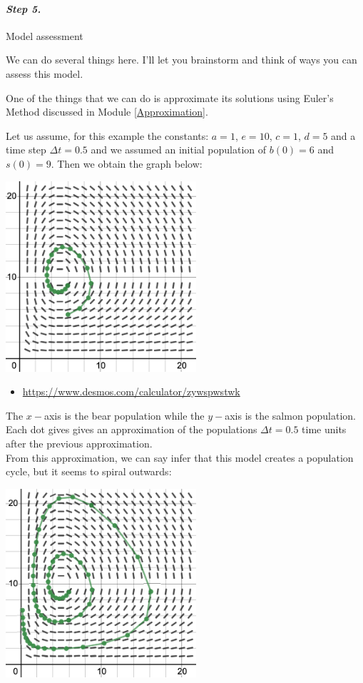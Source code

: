 \paragraph{\emph{Step 5.}} Model assessment

\begin{example}

We can do several things here. I'll let you brainstorm and think of ways you can assess this model.

One of the things that we can do is approximate its solutions using Euler's Method discussed in Module \ref{Approximation}. 

Let us assume, for this example the constants: $a=1$, $e=10$, $c=1$, $d=5$ and a time step $\Delta t = 0.5$ and we assumed an initial population of $b(0)=6$ and $s(0)=9$. Then we obtain the graph below:


\begin{center}
\includegraphics*[width=200pt]{images/module15-lotka-volterra.png}
\end{center}
\begin{itemize}
	\item \url{https://www.desmos.com/calculator/zywspwstwk} \hfill {}
\end{itemize}

The $x-$axis is the bear population while the $y-$axis is the salmon population. Each dot gives gives an approximation of the populations $\Delta t = 0.5$ time units after the previous approximation.\\


From this approximation, we can say infer that this model creates a population cycle, but it seems to spiral outwards: 
\begin{center}
\includegraphics*[width=200pt]{images/module15-lotka-volterra-more.png}
\end{center}


\end{example}
